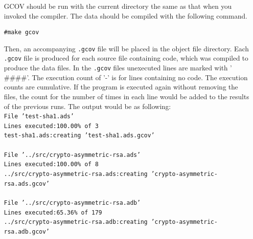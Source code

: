GCOV should be run with the current directory the same as that when
you invoked the compiler. The data should be compiled with the
following command.
\begin{lstlisting}[style=BashInputStyle]
  #make gcov
\end{lstlisting}
Then, an accompanying \texttt{.gcov} file will be placed in the object
file directory.  Each \texttt{.gcov} file is produced for each source
file containing code, which was compiled to produce the data files. In
the \texttt{.gcov} files unexecuted lines are marked with
'$\#\#\#\#$'. The execution count of '-' is for lines containing no
code. The execution counts are cumulative. If the program is executed
again without removing the files, the count for the number of times in
each line would be added to the results of the previous runs.  The
output would be as following:\\
\hspace*{1cm}\texttt{File 'test-sha1.ads'}\\
\hspace*{1cm}\texttt{Lines executed:100.00\% of 3}\\
\hspace*{1cm}\texttt{test-sha1.ads:creating 'test-sha1.ads.gcov'}\\
\\
\hspace*{1cm}\texttt{File '../src/crypto-asymmetric-rsa.ads'}\\
\hspace*{1cm}\texttt{Lines executed:100.00\% of 8}\\
\hspace*{1cm}\texttt{../src/crypto-asymmetric-rsa.ads:creating 'crypto-asymmetric-rsa.ad\-s.gcov'}\\
\\
\hspace*{1cm}\texttt{File '../src/crypto-asymmetric-rsa.adb'}\\
\hspace*{1cm}\texttt{Lines executed:65.36\% of 179}\\
\hspace*{1cm}\texttt{../src/crypto-asymmetric-rsa.adb:creating 'crypto-asymmetric-rsa.ad\-b.gcov'}\\

